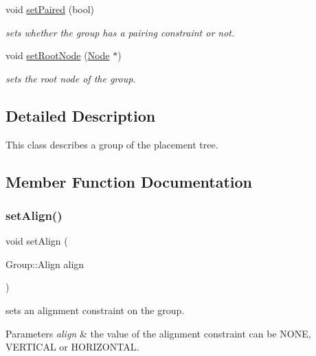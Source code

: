 \begin{DoxyCompactItemize}
void \mbox{\hyperlink{class_open_chams_1_1_group_aff6de4e5c0da79ad8d0070c03bfd941b}{set\+Paired}} (bool)
\begin{DoxyCompactList}\small\item\em sets whether the group has a pairing constraint or not. \end{DoxyCompactList}\item 
void \mbox{\hyperlink{class_open_chams_1_1_group_adc93b900e943312e905182fe44f21225}{set\+Root\+Node}} (\mbox{\hyperlink{class_open_chams_1_1_node}{Node}} $\ast$)
\begin{DoxyCompactList}\small\item\em sets the root node of the group. \end{DoxyCompactList}\end{DoxyCompactItemize}


\subsection{Detailed Description}
This class describes a group of the placement tree. 

\subsection{Member Function Documentation}
\mbox{\label{class_open_chams_1_1_group_a9fc27b2bc4da99c723102153c4fbf1c0}} 
\subsubsection{\texorpdfstring{set\+Align()}{setAlign()}}
{\footnotesize\ttfamily void set\+Align (\begin{DoxyParamCaption}\item[{Group\+::\+Align}]{align }\end{DoxyParamCaption})\hspace{0.3cm}{\ttfamily [inline]}}



sets an alignment constraint on the group. 


\begin{DoxyParams}{Parameters}
{\em align} & the value of the alignment constraint can be N\+O\+NE, V\+E\+R\+T\+I\+C\+AL or H\+O\+R\+I\+Z\+O\+N\+T\+AL. \\
\hline
\end{DoxyParams}
\mbox{\label{class_open_chams_1_1_group_abefcd8ede34b508fe7d42428a618cb02}} 
